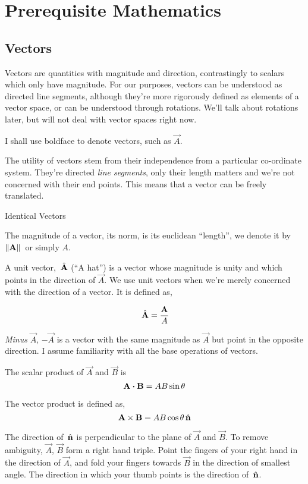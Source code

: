 \chapter{Prerequisite Mathematics}

\section{Vectors}

Vectors are quantities with magnitude and direction, contrastingly to scalars which only have magnitude. 
For our purposes, vectors can be understood as directed line segments, although
they're more rigorously defined as elements of a vector space, or can be 
understood through rotations. We'll talk about rotations later, but will not deal with
vector spaces right now.

I shall use boldface to denote vectors, such as \(\vec{A}\). 

The utility of vectors stem from their independence from a particular co-ordinate system. They're
directed \emph{line segments}, only their length
matters and we're not concerned with their end points. This means that a vector 
can be freely translated. 

\begin{marginfigure}
    \caption{Identical Vectors}
\end{marginfigure}

The magnitude of a vector, its norm, is its euclidean ``length'', we denote it
by \(\norm*{\boldsymbol{\mathbf{A}}}\) or simply \(A\). 

A unit vector, \(\,{\hat{\boldsymbol{\mathbf{A}}}}\) (``A hat'') is a vector whose magnitude is unity
and which points in the direction of \(\vec{A}\). We use unit vectors when we're merely
concerned with the direction of a vector. It is defined as,

\[
    \,{\hat{\boldsymbol{\mathbf{A}}}} = \frac{\boldsymbol{\mathbf{A}}}{A}
\]

\emph{Minus} \(\vec{A}\), \(-\vec{A}\) is a vector with the same magnitude as \(\vec{A}\)
but point in the opposite direction. I assume familiarity with all the base operations of 
vectors.  

The scalar product of \(\vec{A}\) and \(\vec{B}\) is
\[
    \vec{A} \dtp \vec{B} = AB \sin \theta
\]

The vector product is defined as,
\[
    \boldsymbol{\mathbf{A}} \times \boldsymbol{\mathbf{B}} = AB \cos \theta \,{\hat{\boldsymbol{\mathbf{n}}}}
\]

The direction of \(\,{\hat{\boldsymbol{\mathbf{n}}}}\) is perpendicular to the plane of \(\vec{A}\) and \(\vec{B}\). 
To remove ambiguity, \(\vec{A}\), \(\vec{B}\) form a right hand triple. Point the
fingers of your right hand in the direction of \(\vec{A}\), and fold your fingers towards
\(\vec{B}\) in the direction of smallest angle. The direction in which your thumb points
is the direction of \(\,{\hat{\boldsymbol{\mathbf{n}}}}\).

